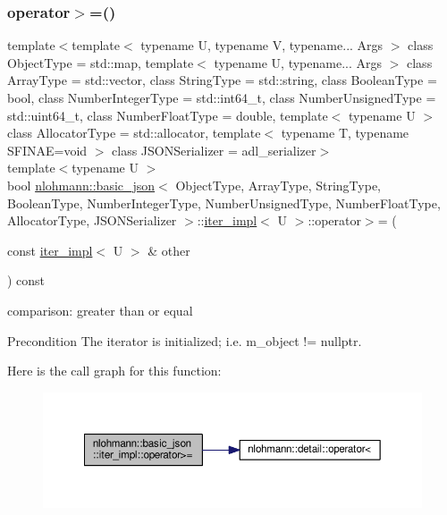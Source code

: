 \subsubsection{\texorpdfstring{operator$>$=()}{operator>=()}}
{\footnotesize\ttfamily template$<$template$<$ typename U, typename V, typename... Args $>$ class Object\+Type = std\+::map, template$<$ typename U, typename... Args $>$ class Array\+Type = std\+::vector, class String\+Type  = std\+::string, class Boolean\+Type  = bool, class Number\+Integer\+Type  = std\+::int64\+\_\+t, class Number\+Unsigned\+Type  = std\+::uint64\+\_\+t, class Number\+Float\+Type  = double, template$<$ typename U $>$ class Allocator\+Type = std\+::allocator, template$<$ typename T, typename S\+F\+I\+N\+A\+E=void $>$ class J\+S\+O\+N\+Serializer = adl\+\_\+serializer$>$ \\
template$<$typename U $>$ \\
bool \hyperlink{classnlohmann_1_1basic__json}{nlohmann\+::basic\+\_\+json}$<$ Object\+Type, Array\+Type, String\+Type, Boolean\+Type, Number\+Integer\+Type, Number\+Unsigned\+Type, Number\+Float\+Type, Allocator\+Type, J\+S\+O\+N\+Serializer $>$\+::\hyperlink{classnlohmann_1_1basic__json_1_1iter__impl}{iter\+\_\+impl}$<$ U $>$\+::operator$>$= (\begin{DoxyParamCaption}\item[{const \hyperlink{classnlohmann_1_1basic__json_1_1iter__impl}{iter\+\_\+impl}$<$ U $>$ \&}]{other }\end{DoxyParamCaption}) const\hspace{0.3cm}{\ttfamily [inline]}}



comparison\+: greater than or equal 

\begin{DoxyPrecond}{Precondition}
The iterator is initialized; i.\+e. {\ttfamily m\+\_\+object != nullptr}. 
\end{DoxyPrecond}
Here is the call graph for this function\+:\nopagebreak
\begin{figure}[H]
\begin{center}
\leavevmode
\includegraphics[width=350pt]{classnlohmann_1_1basic__json_1_1iter__impl_a53a239bddcbd557f335d275c806535c1_cgraph}
\end{center}
\end{figure}
\mbox{\label{classnlohmann_1_1basic__json_1_1iter__impl_ab58eb87c2362183da21c70be74c2b38c}} 
